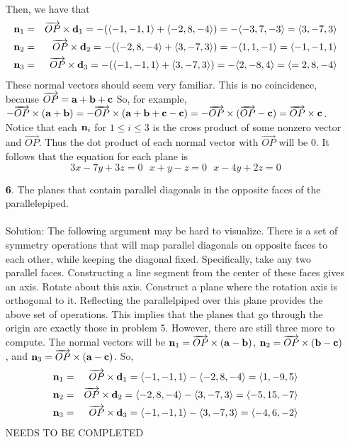 \documentclass[12pt]{amsbook}
\newcommand{\la}{\langle}
\newcommand{\ra}{\rangle}
\begin{document}
\begin{enumerate}
\begin{eqnarray*}
\end{eqnarray*} 
Then, we have that
\begin{eqnarray*}
{\bf n}_1&=&\overrightarrow{OP}\times{\bf d}_1=-(\la -1,-1,1 \ra + \la -2,8,-4 \ra) =-\la -3, 7, -3\ra = \la 3,-7,3 \ra \\
{\bf n}_2&=&\overrightarrow{OP}\times{\bf d}_2=-(\la -2,8,-4 \ra +\la 3,-7,3 \ra) =-\la 1,1,-1\ra = \la -1,-1,1 \ra \\
{\bf n}_3&=&\overrightarrow{OP}\times{\bf d}_3=-(\la -1,-1,1 \ra +\la 3,-7,3 \ra) =-\la 2,-8,4\ra = \la =2,8,-4 \ra
\end{eqnarray*}
These normal vectors should seem very familiar. This is no coincidence, because $\overrightarrow{OP}={\bf a}+{\bf b}+{\bf c}$ So, for example, $-\overrightarrow{OP}\times({\bf a}+{\bf b})=-\overrightarrow{OP}\times({\bf a}+{\bf b}+{\bf c}-{\bf c})=-\overrightarrow{OP}\times(\overrightarrow{OP}-{\bf c})=\overrightarrow{OP}\times{\bf c}$.
\\
Notice that each ${\bf n}_i$ for $1\leq i \leq 3$ is the cross product of some nonzero vector and $\overrightarrow{OP}$. Thus the dot product of each normal vector with $\overrightarrow{OP}$ will be 0. It follows that the equation for each plane is
$$3x-7y+3z=0 \ \ \ x+y-z=0 \ \ \ x-4y+2z =0$$
\item[{\small\bf 6}.]  The planes that contain parallel diagonals
in the opposite faces of the parallelepiped.
\\
\\
{\sc Solution}: The following argument may be hard to visualize. There is a set of symmetry operations that will map parallel diagonals on opposite faces to each other, while keeping the diagonal fixed. Specifically, take any two parallel faces. Constructing a line segment from the center of these faces gives an axis. Rotate about this axis. Construct a plane where the rotation axis is orthogonal to it. Reflecting the parallelpiped over this plane provides the above set of operations. This implies that the planes that go through the origin are exactly those in problem 5. However, there are still three more to compute. The normal vectors will be ${\bf n}_1=\overrightarrow{OP}\times({\bf a}-{\bf b})$, ${\bf n}_2=\overrightarrow{OP}\times({\bf b}-{\bf c})$, and ${\bf n}_3=\overrightarrow{OP}\times({\bf a}-{\bf c})$. So,
 \begin{eqnarray*}
{\bf n}_1&=&\overrightarrow{OP}\times{\bf d}_1=\la -1,-1,1 \ra - \la -2,8,-4 \ra =\la 1, -9, 5\ra\\
{\bf n}_2&=&\overrightarrow{OP}\times{\bf d}_2=\la -2,8,-4 \ra -\la 3,-7,3 \ra =\la -5,15,-7\ra \\
{\bf n}_3&=&\overrightarrow{OP}\times{\bf d}_3=\la -1,-1,1 \ra -\la 3,-7,3 \ra =\la -4,6,-2\ra 
\end{eqnarray*}
NEEDS TO BE COMPLETED
\\
\end{enumerate}  
\end{document}
